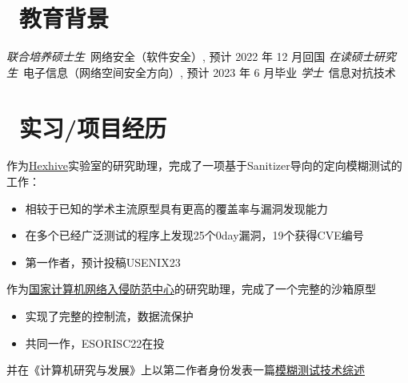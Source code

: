 \documentclass{resume}
\begin{document}


 
\section{\faGraduationCap\  教育背景}
\textit{联合培养硕士生}\ 网络安全（软件安全）, 预计 2022 年 12 月回国
\textit{在读硕士研究生}\ 电子信息（网络空间安全方向）, 预计 2023 年 6 月毕业
\textit{学士}\ 信息对抗技术

\section{\faUsers\ 实习/项目经历}
作为\href{https://hexhive.epfl.ch}{Hexhive}实验室的研究助理，完成了一项基于Sanitizer导向的定向模糊测试的工作：
\begin{itemize}
  \item 相较于已知的学术主流原型具有更高的覆盖率与漏洞发现能力
  \item 在多个已经广泛测试的程序上发现25个0day漏洞，19个获得CVE编号
  \item 第一作者，预计投稿USENIX23
\end{itemize}

作为\href{http://www.nipc.org.cn}{国家计算机网络入侵防范中心}的研究助理，完成了一个完整的沙箱原型
\begin{itemize}
  \item 实现了完整的控制流，数据流保护
  \item 共同一作，ESORISC22在投
\end{itemize}
并在《计算机研究与发展》上以第二作者身份发表一篇\href{https://crad.ict.ac.cn/CN/10.7544/issn1000-1239.2021.20201018}{模糊测试技术综述} %
\end{document}
